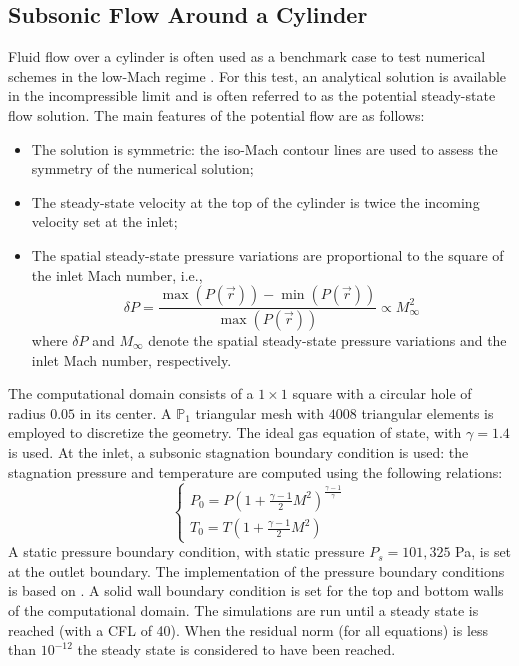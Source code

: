 \documentclass[review,10pt]{elsarticle}
\begin{document}
\subsection{Subsonic Flow Around a Cylinder} \label{sec:cylinder}

Fluid flow over a cylinder is often used as a benchmark case to test numerical schemes in the 
low-Mach regime \cite{LowMach1, LowMach2, LowMach3}. For this test, an analytical solution is available 
in the incompressible limit and is often referred to as the potential steady-state flow solution. 
The main features of the potential flow are as follows:
%
\begin{itemize}
\item The solution is symmetric: the iso-Mach contour lines are used to assess the symmetry of the numerical solution;
\item The steady-state velocity at the top of the cylinder is twice the incoming velocity set at the inlet;
\item The spatial steady-state pressure variations are proportional to the square of the inlet Mach number, i.e., 
\begin{equation}
\delta P = \frac{\max(P(\vec{r})) - \min(P(\vec{r}))}{\max(P(\vec{r}))}  \propto M_\infty^2
\end{equation}
where $\delta P$ and $M_\infty$ denote the spatial steady-state pressure variations and the inlet Mach number, respectively.
\end{itemize}
%
The computational domain consists of a $1\times 1$ square with a circular hole of radius $0.05$ in its center. 
A $\mathbb{P}_1$ triangular mesh with $4008$ triangular elements is employed to discretize the geometry. 
The ideal gas equation of state, with $\gamma=1.4$ is used. At the inlet, a subsonic stagnation boundary 
condition is used: the stagnation pressure and temperature are computed using the following relations:
%
\begin{equation}
\label{eq:stagnation_relations}
\left\{
\begin{array}{l}
P_0 = P\left( 1 + \frac{\gamma-1}{2} M^2 \right)^{\frac{\gamma-1}{\gamma}} \\
T_0 = T\left( 1 + \frac{\gamma-1}{2} M^2 \right)
\end{array}
\right.
\end{equation}
%
A static pressure boundary condition, with static pressure $P_s = 101,325$ Pa, is set at the outlet boundary. 
The implementation of the pressure boundary conditions is based on \cite{SEM}. A solid wall boundary condition 
is set for the top and bottom walls of the computational domain. The simulations are run until a steady state 
is reached (with a CFL of 40). When the residual norm (for all equations) is less than $10^{-12}$ the 
steady state is considered to have been reached.
\end{document}

